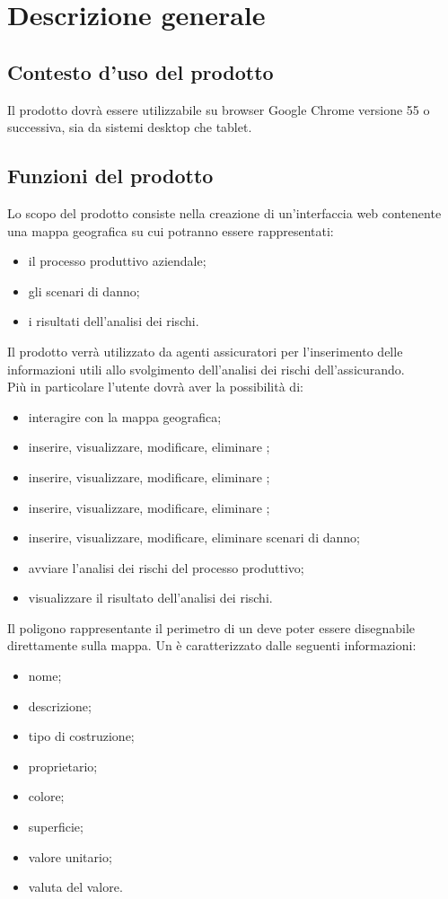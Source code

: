 \section{Descrizione generale}
\subsection{Contesto d'uso del prodotto}
Il prodotto dovrà essere utilizzabile su browser Google Chrome versione 55 o successiva, sia da sistemi desktop che tablet.
\subsection{Funzioni del prodotto}
	Lo scopo del prodotto consiste nella creazione di un'interfaccia web contenente una mappa geografica su cui potranno essere rappresentati:
	\begin{itemize}
		\item il processo produttivo aziendale;
		\item gli scenari di danno;
		\item i risultati dell'analisi dei rischi.
	\end{itemize}
	Il prodotto verrà utilizzato da agenti assicuratori per l'inserimento delle informazioni utili allo svolgimento dell'analisi dei rischi dell'assicurando.\\
	Più in particolare l'utente dovrà aver la possibilità di:
	\begin{itemize}
        \item interagire con la mappa geografica;
		\item inserire, visualizzare, modificare, eliminare ;
		\item inserire, visualizzare, modificare, eliminare ;
		\item inserire, visualizzare, modificare, eliminare ;
		\item inserire, visualizzare, modificare, eliminare scenari di danno;
		\item avviare l'analisi dei rischi del processo produttivo;
		\item visualizzare il risultato dell'analisi dei rischi.
	\end{itemize}
	Il poligono rappresentante il perimetro di un  deve poter essere disegnabile direttamente sulla mappa. Un  è caratterizzato dalle seguenti informazioni:
		\begin{itemize}
			\item nome;
			\item descrizione;
			\item tipo di costruzione;
			\item proprietario;
			\item colore;
			\item superficie;
			\item valore unitario;
			\item valuta del valore.
		\end{itemize}
